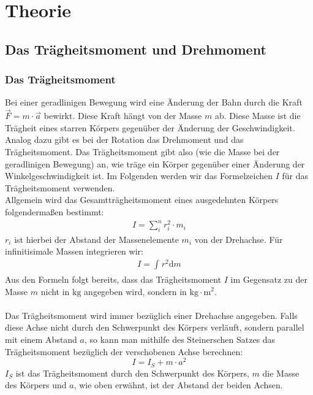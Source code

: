 \section{Theorie}
\label{sec:Theorie}
\subsection{Das Trägheitsmoment und Drehmoment}
\subsubsection{Das Trägheitsmoment}
Bei einer geradlinigen Bewegung wird eine Änderung der Bahn durch die Kraft $\vec{F} = m \cdot \vec{a}$ bewirkt.
Diese Kraft hängt von der Masse $m$ ab. Diese Masse ist die Trägheit eines starren Körpers gegenüber der Änderung
der Geschwindigkeit. 
\\
Analog dazu gibt es bei der Rotation das Drehmoment und das Trägheitsmoment. Das Trägheitsmoment gibt also (wie die 
Masse bei der geradlinigen Bewegung) an, wie träge ein Körper gegenüber einer Änderung der Winkelgeschwindigkeit ist.
Im Folgenden werden wir das Formelzeichen $I$ für das Trägheitsmoment verwenden.
\\
Allgemein wird das Gesamtträgheitsmoment eines ausgedehnten Körpers folgendermaßen bestimmt:
\begin{align}
    I = \sum_{i}^{n} r_i^2 \cdot m_i
\end{align}
$r_i$ ist hierbei der Abstand der Massenelemente $m_i$ von der Drehachse.
Für infinitisimale Massen integrieren wir:
\begin{align}
    I = \int_{}^{}r^2 \mathrm{d}m
\end{align}
Aus den Formeln folgt bereits, dass das Trägheitsmoment $I$ im Gegensatz zu der Masse $m$ nicht in $\mathrm{kg}$ angegeben wird,
sondern in $\mathrm{kg} \cdot \mathrm{m}^2$.
\\ \\
Das Trägheitsmoment wird immer bezüglich einer Drehachse angegeben. Falls diese Achse nicht durch den Schwerpunkt des Körpers
verläuft, sondern parallel mit einem Abstand $a$, so kann man mithilfe des Steinerschen Satzes das Trägheitsmoment bezüglich
der verschobenen Achse berechnen:
\begin{equation}
    I = I_S + m \cdot a^2
\end{equation}
$I_S$ ist das Trägheitsmoment durch den Schwerpunkt des Körpers, $m$ die Masse des Körpers und $a$, wie oben erwähnt, ist der 
Abstand der beiden Achsen.
